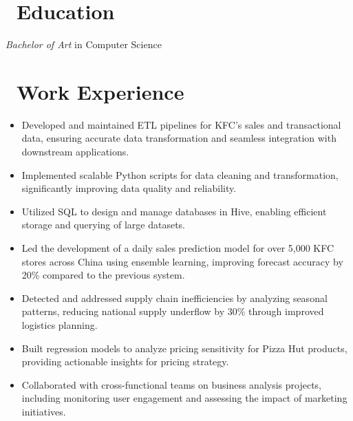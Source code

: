 \documentclass{resume}
\begin{document}

\vspace{2ex}

\section{\faGraduationCap\ Education}
\textit{Bachelor of Art} in Computer Science

\section{\faSitemap\ Work Experience}

\begin{itemize}
  \item Developed and maintained ETL pipelines for KFC’s sales and transactional data, ensuring accurate data transformation and seamless integration with downstream applications.
  \item Implemented scalable Python scripts for data cleaning and transformation, significantly improving data quality and reliability.
  \item Utilized SQL to design and manage databases in Hive, enabling efficient storage and querying of large datasets.
  \item Led the development of a daily sales prediction model for over 5,000 KFC stores across China using ensemble learning, improving forecast accuracy by 20\% compared to the previous system.
  \item Detected and addressed supply chain inefficiencies by analyzing seasonal patterns, reducing national supply underflow by 30\% through improved logistics planning.
  \item Built regression models to analyze pricing sensitivity for Pizza Hut products, providing actionable insights for pricing strategy.
  \item Collaborated with cross-functional teams on business analysis projects, including monitoring user engagement and assessing the impact of marketing initiatives.
\end{itemize}
\end{document}
